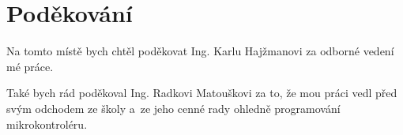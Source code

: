 \section*{Poděkování}
Na tomto místě bych chtěl poděkovat Ing. Karlu Hajžmanovi za odborné vedení
mé práce.

Také bych rád poděkoval Ing. Radkovi Matouškovi za to, že mou práci vedl před
svým odchodem ze školy a~ze jeho cenné rady ohledně programování
mikrokontroléru.
